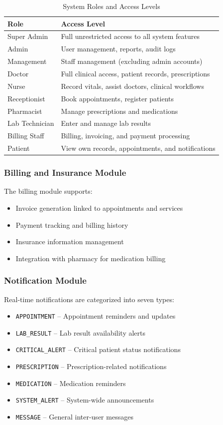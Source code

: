 \documentclass[conference]{IEEEtran}
\begin{document}
\begin{table}[H]
\centering
\caption{System Roles and Access Levels}
\label{tab:roles}
\begin{tabularx}{\columnwidth}{lX}
\toprule
\textbf{Role} & \textbf{Access Level} \\
\midrule
Super Admin    & Full unrestricted access to all system features \\
Admin          & User management, reports, audit logs \\
Management     & Staff management (excluding admin accounts) \\
Doctor         & Full clinical access, patient records, prescriptions \\
Nurse          & Record vitals, assist doctors, clinical workflows \\
Receptionist   & Book appointments, register patients \\
Pharmacist     & Manage prescriptions and medications \\
Lab Technician & Enter and manage lab results \\
Billing Staff  & Billing, invoicing, and payment processing \\
Patient        & View own records, appointments, and notifications \\
\bottomrule
\end{tabularx}
\end{table}

\subsubsection{Billing and Insurance Module}
The billing module supports:
\begin{itemize}[leftmargin=*]
  \item Invoice generation linked to appointments and services
  \item Payment tracking and billing history
  \item Insurance information management
  \item Integration with pharmacy for medication billing
\end{itemize}

\subsubsection{Notification Module}
Real-time notifications are categorized into seven types:
\begin{itemize}[leftmargin=*]
  \item \texttt{APPOINTMENT} -- Appointment reminders and updates
  \item \texttt{LAB\_RESULT} -- Lab result availability alerts
  \item \texttt{CRITICAL\_ALERT} -- Critical patient status notifications
  \item \texttt{PRESCRIPTION} -- Prescription-related notifications
  \item \texttt{MEDICATION} -- Medication reminders
  \item \texttt{SYSTEM\_ALERT} -- System-wide announcements
  \item \texttt{MESSAGE} -- General inter-user messages
\end{itemize}
\end{document}
